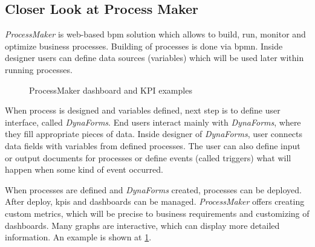  \subsection{Closer Look at Process Maker}
 
 \textit{ProcessMaker} \cite{processmaker} is web-based \gls{bpm} solution which allows to build, run, monitor and optimize business processes. Building of processes is done via \gls{bpmn}. Inside designer users can define data sources (variables) which will be used later within running processes. 
 
\begin{figure}[ht!]
    \centering
    \qquad
    \caption{ProcessMaker dashboard and KPI examples \cite{processmaker}}%
    \label{fig:process-maker-dashboard}%
\end{figure}

 When process is designed and variables defined, next step is to define user interface, called \textit{DynaForms}. End users interact mainly with \textit{DynaForms}, where they fill appropriate pieces of data. 
 Inside designer of \textit{DynaForms}, user connects data fields with variables from defined processes. The user can also define input or output documents for processes or define events (called triggers) what will happen when some kind of event occurred.
 
 When processes are defined and \textit{DynaForms} created, processes can be deployed. After deploy, \gls{kpi}s and dashboards can be managed. \textit{ProcessMaker} offers creating custom metrics, which will be precise to business requirements and customizing of dashboards. Many graphs are interactive, which can display more detailed information. An example is shown at \cref{fig:process-maker-dashboard}.
 
